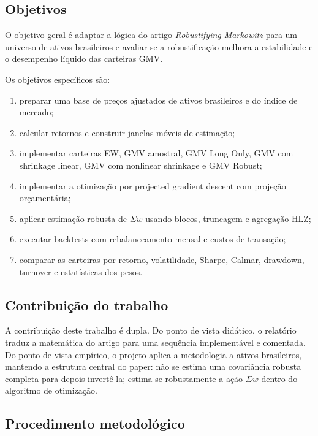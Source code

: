 \documentclass[12pt,a4paper]{article}
\begin{document}
\subsection{Objetivos}

O objetivo geral é adaptar a lógica do artigo \emph{Robustifying Markowitz} para um universo de
ativos brasileiros e avaliar se a robustificação melhora a estabilidade e o desempenho líquido
das carteiras GMV.

Os objetivos específicos são:

\begin{enumerate}[leftmargin=*]
  \item preparar uma base de preços ajustados de ativos brasileiros e do índice de mercado;
  \item calcular retornos e construir janelas móveis de estimação;
  \item implementar carteiras EW, GMV amostral, GMV Long Only, GMV com shrinkage linear, GMV
  com nonlinear shrinkage e GMV Robust;
  \item implementar a otimização por projected gradient descent com projeção orçamentária;
  \item aplicar estimação robusta de $\Sigma w$ usando blocos, truncagem e agregação HLZ;
  \item executar backtests com rebalanceamento mensal e custos de transação;
  \item comparar as carteiras por retorno, volatilidade, Sharpe, Calmar, drawdown, turnover e
  estatísticas dos pesos.
\end{enumerate}

\subsection{Contribuição do trabalho}

A contribuição deste trabalho é dupla. Do ponto de vista didático, o relatório traduz a
matemática do artigo para uma sequência implementável e comentada. Do ponto de vista empírico,
o projeto aplica a metodologia a ativos brasileiros, mantendo a estrutura central do paper:
não se estima uma covariância robusta completa para depois invertê-la; estima-se robustamente a
ação $\Sigma w$ dentro do algoritmo de otimização.

\subsection{Procedimento metodológico}
\end{document}
